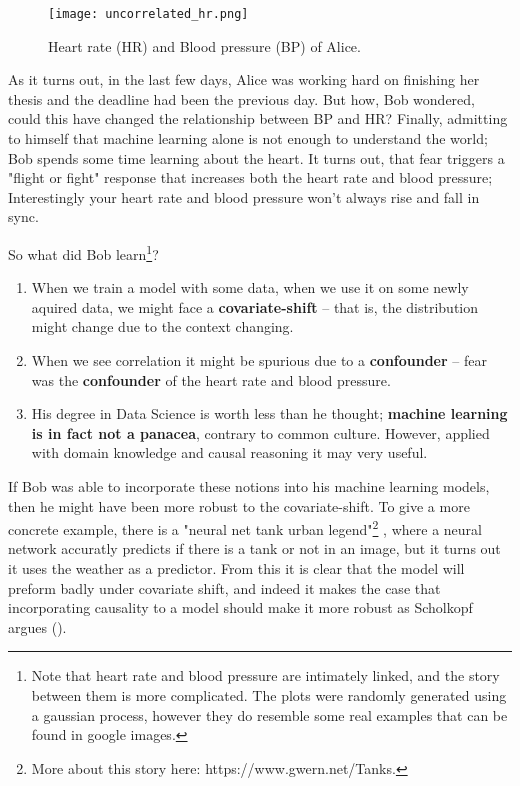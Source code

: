 \begin{figure}[H]
    \centering
    \texttt{[image: uncorrelated\_hr.png]}
    \caption{Heart rate (HR) and Blood pressure (BP) of Alice.}
\end{figure}

As it turns out, in the last few days, Alice was working hard on finishing her thesis and the deadline had been 
the previous day. But how, Bob wondered, could this have changed the relationship between BP and HR? 
Finally, admitting to himself that machine learning alone is not enough to understand the world; 
Bob spends some time learning about the heart. It turns out, that fear triggers a "flight or fight"
response that increases both the heart rate and blood pressure; Interestingly your heart rate and blood pressure 
won’t always rise and fall in sync.

So what did Bob learn\footnote{
    Note that heart rate and blood pressure are intimately linked, and the story between them is more complicated.
    The plots were randomly generated using a gaussian process, however they do resemble some real examples that 
    can be found in google images.
}?

\begin{enumerate}
    \item When we train a model with some data, when we use it on some newly aquired data, we might
    face a \textbf{covariate-shift} -- that is, the distribution might change due to the context changing.
    \item When we see correlation it might be spurious due to a \textbf{confounder} -- fear was the \textbf{confounder} 
    of the heart rate and blood pressure.
    \item His degree in Data Science is worth less than he thought; \textbf{machine learning is in fact not 
    a panacea}, contrary to common culture. However, applied with domain knowledge and causal reasoning
    it may very useful. 
\end{enumerate}

If Bob was able to incorporate these notions into his machine learning models, then he might have been more
robust to the covariate-shift. To give a more concrete example, there is a "neural net tank urban legend"\footnote{
    More about this story here: https://www.gwern.net/Tanks.
}
, where a neural network accuratly predicts if there is a tank or not in an image, but it turns out it uses the 
weather as a predictor. From this it is clear that the model will preform badly under covariate shift, and indeed
it makes the case that incorporating causality to a model should make it more robust as Scholkopf 
argues (\cite{scholkopf2019causality}).

